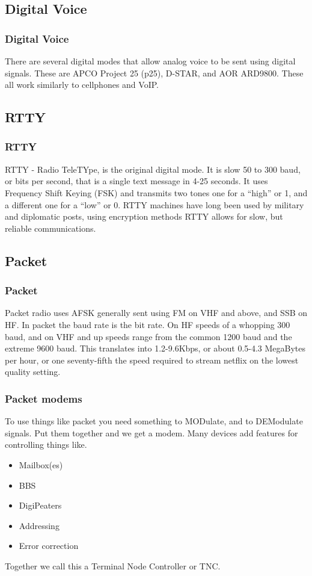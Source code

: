 \documentclass[10pt]{beamer}
\begin{document}
\subsection{Digital Voice}
\begin{frame}
\frametitle{Digital Voice}
There are several digital modes that allow analog voice to be sent using digital signals. These are APCO Project 25 (p25), D-STAR, and AOR ARD9800. These all work similarly to cellphones and VoIP.
\end{frame}

\subsection{RTTY}
\begin{frame}
\frametitle{RTTY}
RTTY - Radio TeleTYpe, is the original digital mode. It is slow 50 to 300 baud, or bits per second, that is a single text message in 4-25 seconds. It uses Frequency Shift Keying (FSK) and transmits two tones one for a ``high'' or 1, and a different one for a ``low'' or 0. RTTY machines have long been used by military and diplomatic posts, using encryption methods RTTY allows for slow, but reliable communications.
\end{frame}

\subsection{Packet}
\begin{frame}
\frametitle{Packet}
Packet radio uses AFSK generally sent using FM on VHF and above, and SSB on HF. In packet the baud rate is the bit rate. On HF speeds of a whopping 300 baud, and on VHF and up speeds range from the common 1200 baud and the extreme 9600 baud. This translates into 1.2-9.6Kbps, or about 0.5-4.3 MegaBytes per hour, or one seventy-fifth the speed required to stream netflix on the lowest quality setting.
\end{frame}

\begin{frame}
\frametitle{Packet modems}
To use things like packet you need something to MODulate, and to DEModulate signals. Put them together and we get a modem. Many devices add features for controlling things like.\\
\begin{itemize}
\item Mailbox(es)
\item BBS
\item DigiPeaters
\item Addressing
\item Error correction
\end{itemize}
Together we call this a Terminal Node Controller or TNC.
\end{frame}
\end{document}
